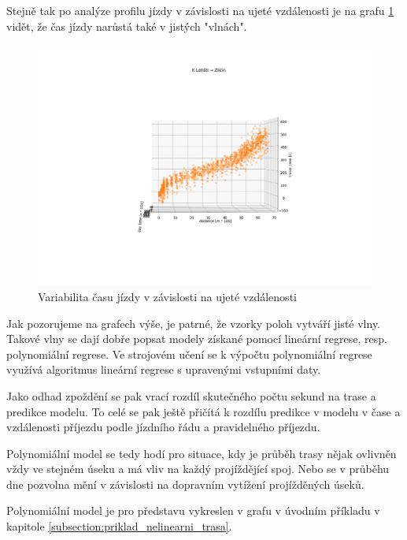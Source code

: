 Stejně tak po analýze profilu jízdy v závislosti na ujeté vzdálenosti je na grafu \ref{fig:dojezd_podle_vzdalenosti} vidět, že čas jízdy narůstá také v jistých "vlnách".


\begin{figure}
\centering
  \includegraphics[width=\linewidth]{../img/dojezd_podle_vzdalenosti.png}
  \caption{Variabilita času jízdy v závislosti na ujeté vzdálenosti}
  \label{fig:dojezd_podle_vzdalenosti}
\end{figure}


Jak pozorujeme na grafech výše, je patrné, že vzorky poloh vytváří jisté vlny. Takové vlny se dají dobře popsat modely získané pomocí lineární regrese, resp. polynomiální regrese. Ve strojovém učení se k výpočtu polynomiální regrese využívá algoritmus lineární regrese s upravenými vstupními daty.


\bigbreak


Jako odhad zpoždění se pak vrací rozdíl skutečného počtu sekund na trase a predikce modelu. To celé se pak ještě přičítá k rozdílu predikce v modelu v čase a vzdálenosti příjezdu podle jízdního řádu a pravidelného příjezdu.


\bigbreak


Polynomiální model se tedy hodí pro situace, kdy je průběh trasy nějak ovlivněn vždy ve stejném úseku a má vliv na každý projíždějící spoj. Nebo se v průběhu dne pozvolna mění v závislosti na dopravním vytížení projížděných úseků.


Polynomiální model je pro představu vykreslen v grafu v úvodním příkladu v kapitole \ref{subsection:priklad_nelinearni_trasa}.



